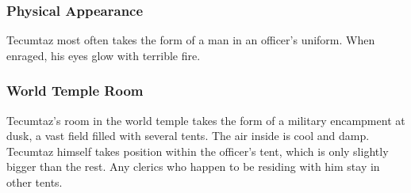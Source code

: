 \subsubsection*{Physical Appearance} 
Tecumtaz most often takes the form of a man in an officer's uniform.
When enraged, his eyes glow with terrible fire.

\subsubsection*{World Temple Room}
Tecumtaz's room in the world temple takes the form of a military encampment at dusk, a vast field filled with several tents.
The air inside is cool and damp.
Tecumtaz himself takes position within the officer's tent, which is only slightly bigger than the rest.
Any clerics who happen to be residing with him stay in other tents.

